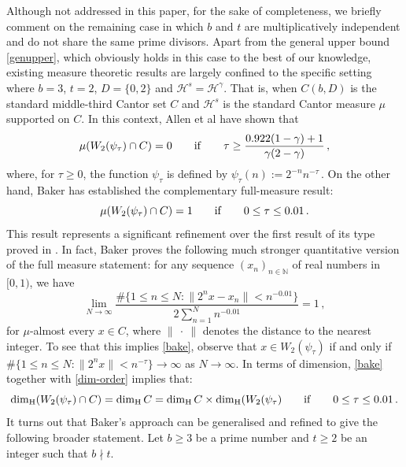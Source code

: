 \documentclass[12pt]{article}
\theoremstyle{definition}
\theoremstyle{remark}
\newcommand{\sv}[1]{{\color{blue}   {#1}}}
\begin{document}
Although not addressed in this paper, for the sake of completeness,   we briefly comment on the  remaining case in which  $b$ and $t$ are multiplicatively independent and  do not share the same prime divisors.  Apart from the general upper bound \eqref{genupper}, which obviously holds in this case  
to the best of our knowledge,  existing measure theoretic  results are largely confined to the specific setting where     $b=3$, $t=2$, $D=\{0,2\}$ and   $\mathcal{H}^{s}= \mathcal{H}^{\gamma} $.  That is,  when $C(b,D)$ is the standard middle-third Cantor set $C$  and $\mathcal{H}^{s}$ is the standard Cantor measure $\mu$ supported on $C$.  In this context,   Allen et al  \cite[Theorem 2]{ABCY2023} have shown  that  $$ \mu(W_{2}(\psi_{\tau})\cap C)=0    \qquad {\rm if }  \qquad  \tau\geq\frac{0.922(1-\gamma)+1}{\gamma(2-\gamma)}  \,  ,  $$
where, for $\tau \ge 0$, the function $\psi_\tau$  is defined by  $ \psi_\tau(n) :=   2^{-n} n^{-\tau}  \, .
$
 On the other hand, Baker \cite{B2024} has established the complementary full-measure result:
  \begin{equation}  \label{bake}  \mu(W_{2}(\psi_{\tau})\cap C)= 1    \qquad {\rm if }  \qquad   0  \le \tau \le 0.01    \,  .  \end{equation}
 This result represents a significant refinement  over the first result of its type proved in \cite{ACY2023}.  In fact,    Baker \cite[Theorem 1.5]{B2024} proves  the following  much  stronger quantitative  version of the full measure statement:     for any sequence $(x_{n})_{n \in \mathbb{N}}$ of real numbers in $[0,1)$, we have
    $$\lim_{N\to\infty}\frac{\#\{1\le n\le N:\|2^{n}x-x_{n}\|<n^{-0.01}\}}{2\sum_{n=1}^{N}n^{-0.01}}=1   \, , $$
 for $\mu$-almost every $x\in C$, where $\| \ \cdot  \ \| $ denotes the distance to the nearest integer.  To see that this implies  \eqref{bake}, observe  that $x \in W_{2}(\psi_{\tau}) $   if and only if  $\#\{1\le n\le N:\|2^{n}x \|<n^{-\tau}\}   \to  \infty $ as $N \to \infty$.  In terms of dimension,  \eqref{bake} together with \eqref{dim-order}  implies that:   $$
    \dim_{\rm H}(W_{2}(\psi_{\tau} )\cap C)=\dim_{\rm H}C   =  \dim_{\rm H}C \times   \dim_{\rm H}(W_{2}(\psi_{\tau} )    \qquad {\rm if }  \qquad   0  \le \tau \le 0.01    \, .
    $$
    It turns out that Baker's approach can be  generalised and  refined   to   give the following broader statement.  Let  $b\geq3$  be a prime number and $t\geq2$ be an integer such that $b\nmid t$. 
\end{document}
